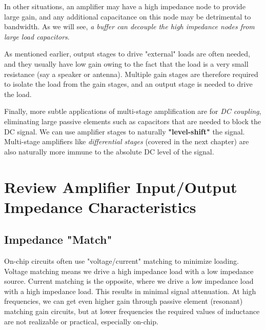 In other situations, an amplifier may have a high impedance node to provide large gain, and any additional capacitance on this node may be detrimental to bandwidth.  As we will see, \textit{a buffer can decouple the high impedance nodes from large load capacitors}.  

As mentioned earlier, output stages to drive "external" loads are often needed, and they usually have low gain owing to the fact that the load is a very small resistance (say a speaker or antenna).  Multiple gain stages are therefore required to isolate the load from the gain stages, and an output stage is needed to drive the load.  

Finally, more subtle applications of multi-stage amplification are for \textit{DC coupling}, eliminating large passive elements such as capacitors that are needed to block the DC signal.   We can use amplifier stages to naturally \textbf{"level-shift"} the signal.  Multi-stage amplifiers like \textit{differential stages} (covered in the next chapter) are also naturally more immune to the absolute DC level of the signal.  
\section{Review Amplifier Input/Output Impedance Characteristics}
\subsection{Impedance "Match"}
On-chip circuits often use "voltage/current" matching to minimize loading.  Voltage matching means we drive a high impedance load with a low impedance source.  Current matching is the opposite, where we drive a low impedance load with a high impedance load.  This results in minimal signal attenuation.  At high frequencies, we can get even higher gain through passive element (resonant) matching gain circuits, but at lower frequencies the required values of inductance are not realizable or practical, especially on-chip.

